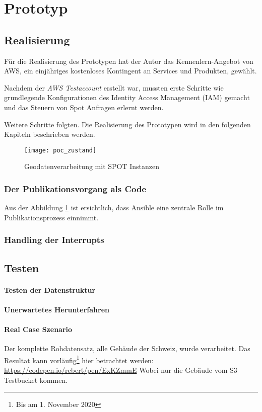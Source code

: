 \section{Prototyp}
\subsection{Realisierung}
Für die Realisierung des Prototypen hat der Autor das Kennenlern-Angebot von AWS, ein einjähriges kostenloses Kontingent an Services und Produkten\cite{FreeTier2020}, gewählt. 

Nachdem der \emph{AWS Testaccount} erstellt war, mussten erste Schritte wie grundlegende Konfigurationen des Identity Access Management (IAM) gemacht und das Steuern von Spot Anfragen erlernt werden.

Weitere Schritte folgten. Die Realisierung des Prototypen wird in den folgenden Kapiteln beschrieben werden.

\begin{figure}[H]
	\centering
	\texttt{[image: poc\_zustand]}
	\caption{Geodatenverarbeitung mit SPOT Instanzen}
	\label{fig:ist_zustand}
\end{figure}

\subsubsection{Der Publikationsvorgang als Code}
Aus der Abbildung \ref{fig:ist_zustand} ist ersichtlich, dass Ansible eine zentrale Rolle im Publikationsprozess einnimmt. 

\subsubsection{Handling der Interrupts}



\subsection{Testen}

\paragraph{Testen der Datenstruktur}


\paragraph{Unerwartetes Herunterfahren}


\paragraph{Real Case Szenario}

Der komplette Rohdatensatz, alle Gebäude der Schweiz, wurde verarbeitet. Das Resultat kann vorläufig\footnote{Bis am 1. November 2020} hier betrachtet werden:
\href{https://codepen.io/rebert/pen/ExKZmmE}{https://codepen.io/rebert/pen/ExKZmmE} Wobei nur die Gebäude vom S3 Testbucket kommen.
